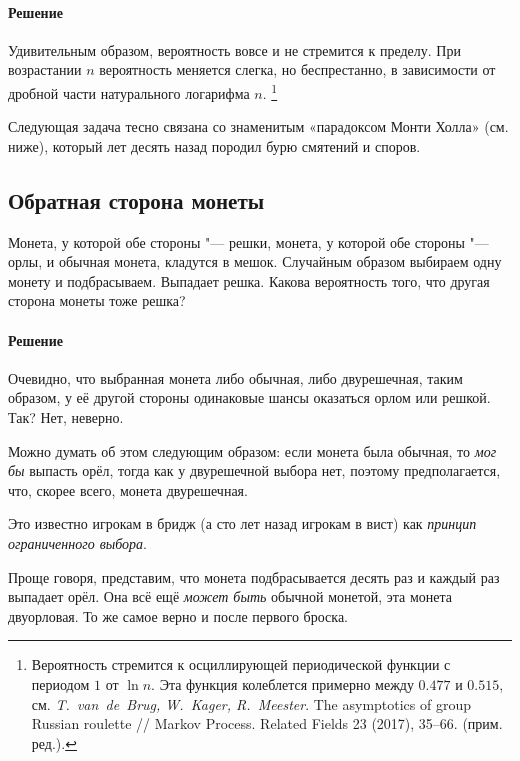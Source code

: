 \documentclass[twoside]{book}
\makeatletter
\newcommand{\rindex}[2][\imki@jobname]{%
  \index[#1]{\detokenize{#2}}%
}
\makeatother
\begin{document}
\paragraph{Решение} Удивительным образом, вероятность вовсе и не стремится к пределу.
При возрастании $n$ вероятность меняется слегка, но беспрестанно, в зависимости от дробной части натурального логарифма $n$.%
\footnote{Вероятность стремится к осциллирующей периодической функции с периодом $1$ от $\ln n$.
Эта функция колеблется примерно между $0.477$ и $0.515$, см.
\emph{T.~van~de~Brug, W.~Kager, R.~Meester}. The asymptotics of group Russian roulette /\!/ {Markov Process. Related Fields} 23 (2017), 35--66.
(прим. ред.).}

\medskip

Следующая задача тесно связана со знаменитым «парадоксом Монти Холла» (см. ниже), который лет десять назад породил бурю смятений и споров.

\subsection*{Обратная сторона монеты}%
\rindex{Обратная сторона монеты}

Монета, у которой обе стороны "--- решки, монета, у которой обе стороны "--- орлы, и обычная монета, кладутся в мешок.
Случайным образом выбираем одну монету и подбрасываем.
Выпадает решка.
Какова вероятность того, что другая сторона монеты тоже решка?

\paragraph{Решение}
Очевидно, что выбранная монета либо обычная, либо двурешечная, таким образом, у её другой стороны одинаковые шансы оказаться орлом или решкой.
Так?
Нет, неверно.

Можно думать об этом следующим образом: если монета была обычная, то \emph{мог бы} выпасть орёл, тогда как у двурешечной выбора нет, поэтому предполагается, что, скорее всего, монета двурешечная.

Это известно игрокам в бридж (а сто лет назад игрокам в вист) как \emph{принцип ограниченного выбора}.

Проще говоря, представим, что монета подбрасывается десять раз и каждый раз выпадает орёл.
Она всё ещё \emph{может быть} обычной монетой,  эта монета двуорловая.
То же самое верно и после первого броска.
\end{document}
